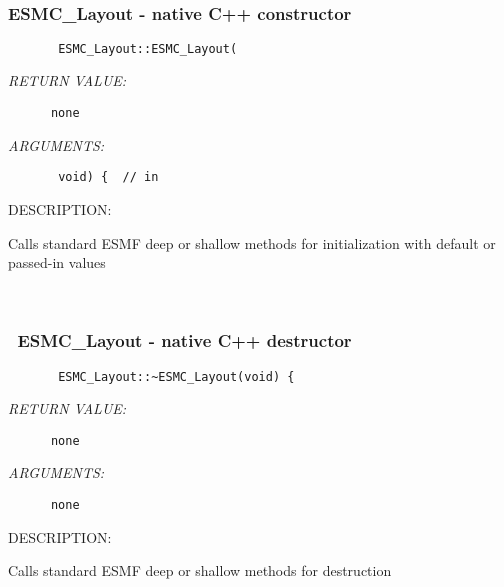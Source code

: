 \mbox{}\hrulefill\ 
 
\subsubsection{ESMC\_Layout - native C++ constructor}


  
\begin{verbatim}       ESMC_Layout::ESMC_Layout(\end{verbatim}{\em RETURN VALUE:}
\begin{verbatim}      none\end{verbatim}{\em ARGUMENTS:}
\begin{verbatim}       void) {  // in\end{verbatim}
{\sf DESCRIPTION:\\ }


        Calls standard ESMF deep or shallow methods for initialization
        with default or passed-in values
   
 
\mbox{}\hrulefill\ 
 
\subsubsection{~ESMC\_Layout - native C++ destructor}


  
\begin{verbatim}       ESMC_Layout::~ESMC_Layout(void) {\end{verbatim}{\em RETURN VALUE:}
\begin{verbatim}      none\end{verbatim}{\em ARGUMENTS:}
\begin{verbatim}      none\end{verbatim}
{\sf DESCRIPTION:\\ }


        Calls standard ESMF deep or shallow methods for destruction
  
